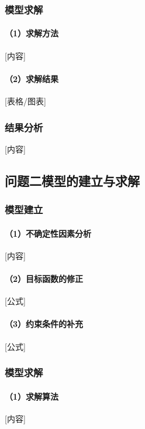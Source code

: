 \documentclass[a4paper,12pt]{article}
\begin{document}
	\subsubsection{模型求解}
	
	\paragraph{（1）求解方法}
	[内容]
	
	\paragraph{（2）求解结果}
	[表格/图表]
	
	\subsubsection{结果分析}
	[内容]
	
	\subsection{问题二模型的建立与求解}
	
	\subsubsection{模型建立}
	
	\paragraph{（1）不确定性因素分析}
	[内容]
	
	\paragraph{（2）目标函数的修正}
	[公式]
	
	\paragraph{（3）约束条件的补充}
	[公式]
	
	\subsubsection{模型求解}
	
	\paragraph{（1）求解算法}
	[内容]
	
\end{document}

